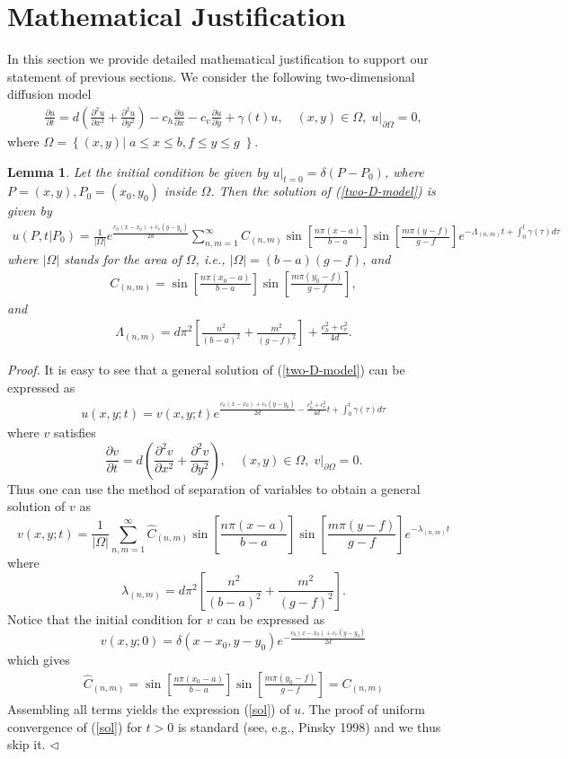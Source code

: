 \documentclass[11pt]{article}
\newtheorem{lemma}{Lemma}[section]
\newenvironment{proof}{{\it Proof. }}{$\triangleleft$}
\newcommand{\bean}{\begin{eqnarray*}}
\newcommand{\eean}{\end{eqnarray*}}
\newcommand{\bea}{\begin{eqnarray}}
\newcommand{\eea}{\end{eqnarray}}
\newcommand{\eq}{\begin{equation}\begin{array}{lllllllllllllllllllllllllllllllll}}
\newcommand{\ee}{\end{array}\end{equation}}
\begin{document}
\section{Mathematical Justification}\label{MJ}
In this section we provide detailed mathematical justification to support our statement of previous sections. We consider the following two-dimensional diffusion model
\bea\label{two-D-model}
\frac{\partial u}{\partial t}=d\left(\frac{\partial^2u}{\partial x^2}+\frac{\partial^2u}{\partial y^2}\right)-c_h\frac{\partial u}{\partial x}-c_v\frac{\partial u}{\partial y}+\gamma(t) u, \quad (x, y)\in \Omega, \;
u|_{\partial \Omega}=0,
\eea
where $\Omega=\left\{(x, y)|\; a\leq x\leq b, f\leq y\leq g\;\right\}$.
\begin{lemma}\label{lem1} Let the initial condition be given by $u|_{t=0}=\delta(P-P_0)$, where $P=(x, y), P_0=(x_0, y_0)$ inside $\Omega$. Then the solution of (\ref{two-D-model}) is given by
{\small
\eq\label{sol}
u(P, t|P_0)=\displaystyle\frac{1}{|\Omega|}e^{\frac{c_h(x-x_0)+c_v(y-y_0)}{2d}}\sum_{n, m=1}^{\infty}
C_{(n, m)}\sin\left[\frac{n\pi(x-a)}{b-a}\right]\sin\left[\frac{m\pi(y-f)}{g-f}\right]e^{-\Lambda_{(n, m)}t+\int_0^t\gamma(\tau)d\tau}
\ee}
where  $|\Omega|$ stands for the area of $\Omega$, i.e., $|\Omega|=(b-a)(g-f)$, and
{\small
\bean
C_{(n, m)}=\sin\left[\frac{n\pi(x_0-a)}{b-a}\right]\sin\left[\frac{m\pi(y_0-f)}{g-f}\right],
\eean}
and
{\small
\bean
\Lambda_{(n, m)}=d\pi^2\left[\frac{n^2}{(b-a)^2}+\frac{m^2}{(g-f)^2}\right]+\frac{c_h^2+c_v^2}{4d}.
\eean}
\end{lemma}
\begin{proof} It is easy to see that a general solution of (\ref{two-D-model}) can be expressed as
\bean
u(x, y; t)=v(x, y; t)e^{\frac{c_h(x-x_0)+c_v(y-y_0)}{2d}-\frac{c_h^2+c_v^2}{4d}t+\int_0^t\gamma(\tau)d\tau}
\eean 
where $v$ satisfies 
\[ \frac{\partial v}{\partial t}=d\left(\frac{\partial^2v}{\partial x^2}+\frac{\partial^2v}{\partial y^2}\right), \quad (x, y)\in \Omega, \;
v|_{\partial \Omega}=0.\]
Thus one can use the method of separation of variables to obtain a general solution of $v$ as
\[v(x, y; t)= \frac{1}{|\Omega|}\sum_{n,m =1}^{\infty}\hat{C}_{(n, m)}\sin\left[\frac{n\pi(x-a)}{b-a}\right]\sin\left[\frac{m\pi(y-f)}{g-f}\right] e^{-\lambda_{(n, m)}t}\]
where 
\[ \lambda_{(n, m)}= d\pi^2\left[\frac{n^2}{(b-a)^2}+\frac{m^2}{(g-f)^2} \right].\]
Notice that the initial condition for $v$ can be expressed as
\[v(x, y; 0)=\delta(x-x_0, y-y_0)e^{-\frac{c_h(x-x_0)+c_v(y-y_0)}{2d}}\]
which gives 
\bean
\hat{C}_{(n, m)}=\sin\left[\frac{n\pi(x_0-a)}{b-a}\right]\sin\left[\frac{m\pi(y_0-f)}{g-f}\right]=C_{(n, m)}
\eean
Assembling all terms yields the expression (\ref{sol}) of $u$. The proof of uniform convergence of (\ref{sol}) for $t>0$ is standard (see, e.g., Pinsky 1998) and we thus skip it.    
\end{proof}
\end{document}
